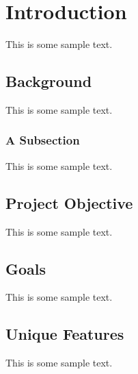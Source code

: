 \chapter{Introduction}

This is some sample text.

\section{Background}

This is some sample text.

\subsection{A Subsection}

This is some sample text.

\section{Project Objective}

This is some sample text.

\section{Goals}

This is some sample text.

\section{Unique Features}

This is some sample text.
